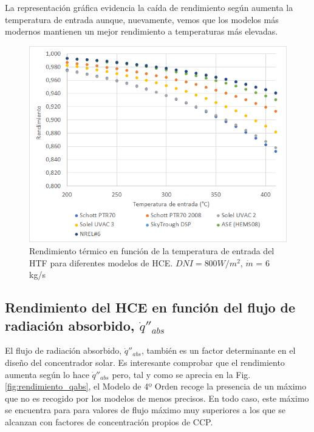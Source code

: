 La representación gráfica evidencia la caída de rendimiento según aumenta la temperatura de entrada aunque, nuevamente, vemos que los modelos más modernos mantienen un mejor rendimiento a temperaturas más elevadas.

\begin{figure}[H]
\includegraphics[width=0.9\linewidth]{images/rendimiento_temperatura.png}
\caption[Rendimiento térmico en función de la temperatura de entrada del HTF para diferentes modelos de HCE]{Rendimiento térmico en función de la temperatura de entrada del HTF para diferentes modelos de HCE. $DNI= 800 W/m^2$, $\dot m$ = 6 kg/s} 
\label{fig:test2a}
\end{figure}

\subsection{Rendimiento del HCE en función del flujo de radiación absorbido, $\dot q''_{abs}$}

El flujo de radiación absorbido, $\dot q''_{abs}$,  también es un factor determinante en el diseño del concentrador solar. Es interesante comprobar que el rendimiento aumenta según lo hace $\dot q''_{abs}$ pero, tal y como se aprecia en la Fig. \ref{fig:rendimiento_qabs}, el Modelo de 4º Orden recoge la presencia de un máximo que no es recogido por los modelos de menos precisos.  En todo caso, este máximo se encuentra para para valores de flujo máximo muy superiores a los que se alcanzan con factores de concentración propios de CCP.

